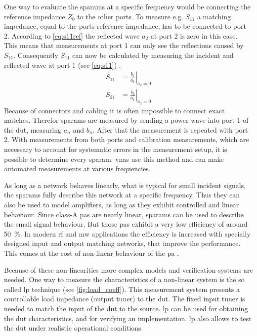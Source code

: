 \documentclass[12pt,a4paper,parskip=full,abstract=true,BCOR=12mm,twoside,open=right]{scrreprt}
\begin{document}
One way to evaluate the \glspl{sparam} at a specific frequency would be connecting
the reference impedance $Z_0$ to the other ports. To measure e.g. $S_{11}$ a matching impedance, equal to the ports reference impedance, has to
be connected to port 2. According to \cref{eq:s11ref} the reflected wave $a_2$
at port 2 is zero in this case. This means that measurements at port 1 can only see the
reflections caused by $S_{11}$. Consequently $S_{11}$ can now be calculated by measuring the incident
and reflected wave at port 1 (see \cref{eq:s11}) \cite{agilent_an_154}.
\begin{align}
    \label{eq:s11} S_{11} & = \left.\frac{b_1}{a_1} \right\rvert_{a_2 = 0}\\
    \label{eq:s21} S_{21} & = \left.\frac{b_2}{a_1} \right\rvert_{a_2 = 0}
\end{align}
Because of connectors and cabling it is often impossible to connect exact matches. Therefor
\glspl{sparam} are measured by sending a power wave into port 1 of the \gls{dut}, measuring
$a_n$ and $b_n$. After that the measurement is repeated with port 2. With measurements from
both ports and calibration measurements, which are necessary to account for systematic errors in the measurement setup,
it is possible to determine every \gls{sparam}. \Glspl{vna} use this method
and can make automated measurements at various frequencies.

As long as a network behaves linearly, what is typical for small incident signals, the \glspl{sparam}
fully describe this network at a specific frequency. Thus they can also be used
to model amplifiers, as long as they exhibit controlled and linear behaviour. Since
class-A \glspl{pa} are nearly linear, \glspl{sparam} can be used to describe the small
signal behaviour. But those \glspl{pa} exhibit a very low efficiency of around \SI{50}{\percent}.
In modern \gls{rf} and \gls{mw} applications the efficiency is increased with specially designed input and
output matching networks, that improve the performance. This comes at the cost of non-linear
behaviour of the \gls{pa} \cite{ghannouchi_load-pull_2013}.

Because of these non-linearities more complex models and verification systems are
needed. One way to measure the characteristics of a non-linear system is the so called
\gls{lp} technique (see \cref{fig:load_coeff}). This measurement system presents a
controllable load impedance (output tuner) to the \gls{dut}. The fixed input tuner is
needed to match the input of the \gls{dut} to the source. \Gls{lp} can be used for obtaining the
\gls{dut} characteristics, and for verifying an implementation. \Gls{lp} also
allows to test the \gls{dut} under realistic operational conditions.
\end{document}
